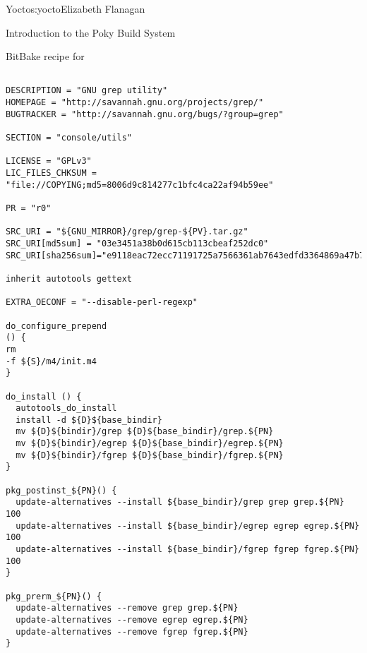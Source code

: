 \begin{aosachapter}{Yocto}{s:yocto}{Elizabeth Flanagan}
\begin{aosasect1}{Introduction to the Poky Build System}

\begin{aosabox}{BitBake recipe for }

\begin{verbatim}

DESCRIPTION = "GNU grep utility"
HOMEPAGE = "http://savannah.gnu.org/projects/grep/"
BUGTRACKER = "http://savannah.gnu.org/bugs/?group=grep"

SECTION = "console/utils"

LICENSE = "GPLv3"
LIC_FILES_CHKSUM = "file://COPYING;md5=8006d9c814277c1bfc4ca22af94b59ee"

PR = "r0"

SRC_URI = "${GNU_MIRROR}/grep/grep-${PV}.tar.gz"
SRC_URI[md5sum] = "03e3451a38b0d615cb113cbeaf252dc0"
SRC_URI[sha256sum]="e9118eac72ecc71191725a7566361ab7643edfd3364869a47b78dc934a357970"

inherit autotools gettext

EXTRA_OECONF = "--disable-perl-regexp"

do_configure_prepend
() {
rm
-f ${S}/m4/init.m4
}

do_install () {
  autotools_do_install
  install -d ${D}${base_bindir}
  mv ${D}${bindir}/grep ${D}${base_bindir}/grep.${PN}
  mv ${D}${bindir}/egrep ${D}${base_bindir}/egrep.${PN}
  mv ${D}${bindir}/fgrep ${D}${base_bindir}/fgrep.${PN}
}

pkg_postinst_${PN}() {
  update-alternatives --install ${base_bindir}/grep grep grep.${PN} 100
  update-alternatives --install ${base_bindir}/egrep egrep egrep.${PN} 100
  update-alternatives --install ${base_bindir}/fgrep fgrep fgrep.${PN} 100
}

pkg_prerm_${PN}() {
  update-alternatives --remove grep grep.${PN}
  update-alternatives --remove egrep egrep.${PN}
  update-alternatives --remove fgrep fgrep.${PN}
}
\end{verbatim}
\end{aosabox}


\end{aosasect1}
\end{aosachapter}
